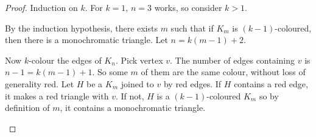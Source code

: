 \documentclass{article}
\newcommand{\red}[1]{\textcolor{bred}{#1}}
\begin{document}
\begin{proof}
    Induction on $k$. For $k=1$, $n=3$ works, so consider $k>1$.

    By the induction hypothesis, there exists $m$ such that if $K_m$ is $(k-1)$-coloured, then there is a monochromatic triangle.  Let $n = k(m-1) + 2$.

    Now $k$-colour the edges of $K_n$.  Pick vertex $v$.
    The number of edges containing $v$ is $n-1 = k(m-1)+1$.  So some $m$ of them are the same colour, without loss of generality \red{red}.
    Let $H$ be a $K_m$ joined to $v$ by \red{red edges}. If $H$ contains a \red{red edge}, it makes a \red{red triangle} with $v$.
    If not, $H$ is a $(k-1)$-coloured $K_m$ so by definition of $m$, it contains a monochromatic triangle.
    \begin{center}
    \end{center}
\end{proof}
\end{document}
